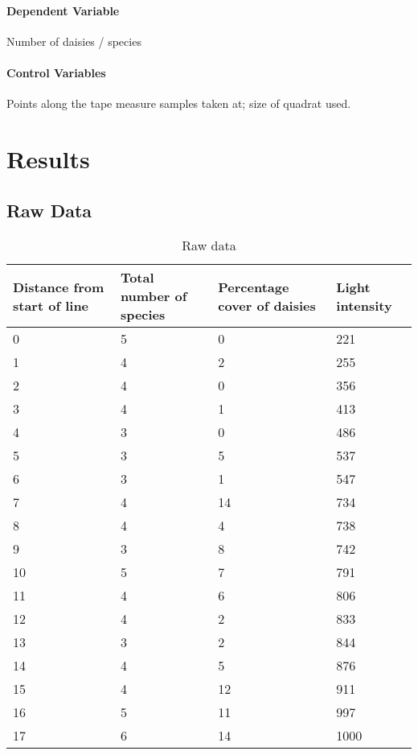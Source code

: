 \documentclass{thomasClass}
\begin{document}
\paragraph{Dependent Variable}
Number of daisies / species
\paragraph{Control Variables}
Points along the tape measure samples taken at; size of quadrat used.

\section{Results}
\subsection{Raw Data}
\begin{table}[H]
\centering
\begin{tabularx}{0.8\textwidth}{X | X X X}
Distance from start of line & Total number of species & Percentage cover of daisies & Light intensity \\
\hline
0 & 5 & 0 & 221 \\
1 & 4 & 2 & 255 \\
2 & 4 & 0 & 356 \\
3 & 4 & 1 & 413 \\
4 & 3 & 0 & 486 \\
5 & 3 & 5 & 537 \\
6 & 3 & 1 & 547 \\
7 & 4 & 14 & 734 \\
8 & 4 & 4 & 738 \\
9 & 3 & 8 & 742 \\
10 & 5 & 7 & 791 \\
11 & 4 & 6 & 806 \\
12 & 4 & 2 & 833 \\
13 & 3 & 2 & 844 \\
14 & 4 & 5 & 876 \\
15 & 4 & 12 & 911 \\
16 & 5 & 11 & 997 \\
17 & 6 & 14 & 1000
\end{tabularx}
\caption{Raw data}
\end{table}
\end{document}

